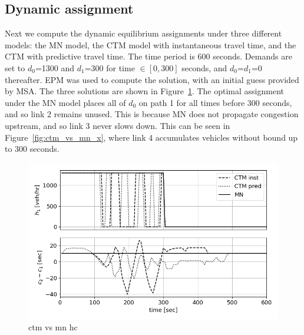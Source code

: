 
\subsection{Dynamic assignment}
Next we compute the dynamic equilibrium assignments under three different models: the MN model, the CTM model with instantaneous travel time, and the CTM with predictive travel time. The time period is 600 seconds. Demands are set to $d_0$=1300 and $d_1$=300 for time $\in[0,300]$ seconds, and $d_0$=$d_1$=0 thereafter. EPM was used to compute the solution, with an initial guess provided by MSA. The three solutions are shown in Figure~\ref{fig:ctm_vs_mn_hc}. The optimal assignment under the MN model places all of $d_0$ on path 1 for all times before 300 seconds, and so link 2 remains unused. This is because MN does not propagate congestion upstream, and so link 3 never slows down. This can be seen in Figure~\ref{fig:ctm_vs_mn_x}, where link 4 accumulates vehicles without bound up to 300 seconds. 
\begin{figure}[h]
    \centering
    \includegraphics[width=\linewidth]{figs/ctm_vs_mn_hc.png}
    \caption{ctm vs mn hc}
    \label{fig:ctm_vs_mn_hc}
\end{figure}

